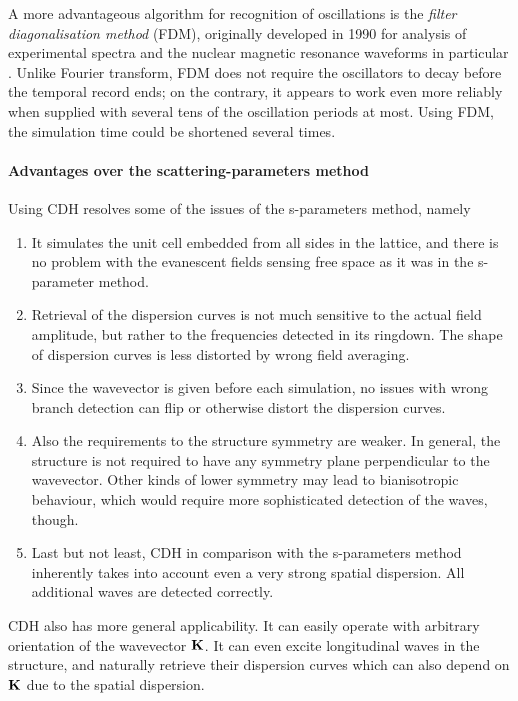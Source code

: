 A more advantageous algorithm for recognition of oscillations is the \textit{filter diagonalisation method} (FDM), originally  developed in 1990 for analysis of experimental spectra and the nuclear magnetic resonance waveforms in particular \cite{mandelshtam1997harmonic, chao2002comparative}. Unlike Fourier transform, FDM does not require the oscillators to decay before the temporal record ends; on the contrary, it appears to work even more reliably when supplied with several tens of the oscillation periods at most. Using FDM, the simulation time could be shortened several times.

\paragraph{Advantages over the scattering-parameters method}%
Using CDH resolves some of the issues of the s-parameters method, namely 
\begin{enumerate}
\item{It simulates the unit cell embedded from all sides in the lattice, and there is no problem with the evanescent fields sensing free space as it was in the s-parameter method.} 
\item{Retrieval of the dispersion curves is not much sensitive to the actual field amplitude, but rather to the frequencies detected in its ringdown. The shape of dispersion curves is less distorted by wrong field averaging.} 
\item{Since the wavevector is given before each simulation, no issues with wrong branch detection can flip or otherwise distort the dispersion curves.} 
\item{Also the requirements to the structure symmetry are weaker. In general, the structure is not required to have any symmetry plane perpendicular to the wavevector. Other kinds of lower symmetry may lead to bianisotropic behaviour, which would require more sophisticated detection of the waves, though.}
\item{Last but not least, CDH in comparison with the s-parameters method inherently takes into account even a very strong spatial dispersion. All additional waves are detected correctly.}
\end{enumerate}

CDH also has more general applicability. It can easily operate with arbitrary orientation of the wavevector ${\mathbf{K}}$. It can even excite longitudinal waves in the structure, and naturally retrieve their dispersion curves which can also depend on ${\mathbf{K}}$ due to the spatial dispersion. 

